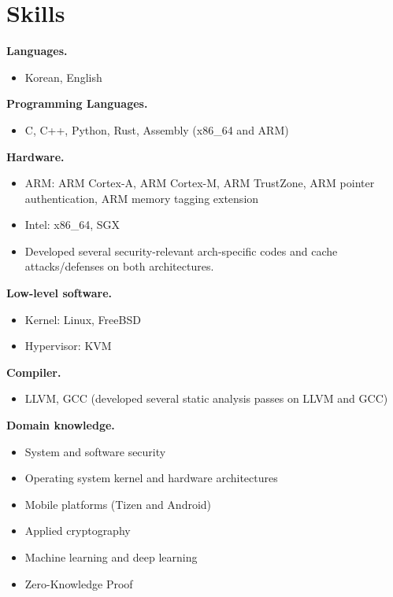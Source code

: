 \documentclass[10pt, a4paper]{article}
\begin{document}
\section{Skills}

\textbf{Languages.} 
\begin{itemize}
  \item Korean, English
\end{itemize}

\textbf{Programming Languages.}
\begin{itemize}
  \item C, C++, Python, Rust, Assembly (x86\_64 and ARM)
\end{itemize}

\textbf{Hardware.}
\begin{itemize}
  \item ARM: ARM Cortex-A, ARM Cortex-M, ARM TrustZone, ARM pointer authentication, ARM memory tagging extension
  \item Intel: x86\_64, SGX
  \item Developed several security-relevant arch-specific codes and cache attacks/defenses on both architectures.
\end{itemize}

\textbf{Low-level software.}
\begin{itemize}
  \item Kernel: Linux, FreeBSD
  \item Hypervisor: KVM
\end{itemize}

\textbf{Compiler.}
\begin{itemize}
  \item LLVM, GCC (developed several static analysis passes on LLVM and GCC)
\end{itemize}

\textbf{Domain knowledge.}
\begin{itemize}
  \item System and software security 
  \item Operating system kernel and hardware architectures
  \item Mobile platforms (Tizen and Android)
  \item Applied cryptography
  \item Machine learning and deep learning
  \item Zero-Knowledge Proof
\end{itemize}

\end{document}
